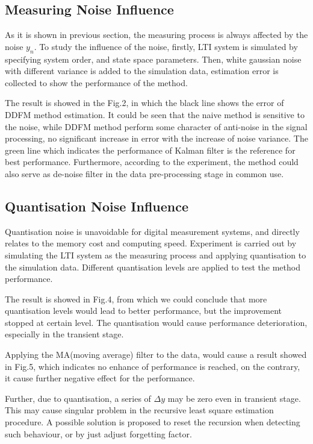 \documentclass[journal]{IEEEtran}
\begin{document}
\subsection{Measuring Noise Influence}
As it is shown in previous section, the measuring process is always affected by the noise $y_n$. To study the influence of the noise, firstly, LTI system is simulated by specifying system order, and state space parameters. Then, white gaussian noise with different variance is added to the simulation data, estimation error is collected to show the performance of the method. 

The result is showed in the Fig.2, in which the black line shows the error of DDFM method estimation. It could be seen that the naive method is sensitive to the noise, while DDFM method perform some character of anti-noise in the signal processing, no significant increase in error with the increase of noise variance. The green line which indicates the performance of Kalman filter is the reference for best performance.
Furthermore, according to the experiment, the method could also serve as de-noise filter in the data pre-processing stage in common use.

\subsection{Quantisation Noise Influence}
Quantisation noise is unavoidable for digital measurement systems, and directly relates to the memory cost and computing speed. Experiment is carried out by simulating the LTI system as the measuring process and applying quantisation to the simulation data. Different quantisation levels are applied to test the method performance.

The result is showed in Fig.4, from which we could conclude that more quantisation levels would lead to better performance, but the improvement stopped at certain level. The quantisation would cause performance deterioration, especially in the transient stage.

Applying the MA(moving average) filter to the data, would cause a result showed in Fig.5, which indicates no enhance of performance is reached, on the contrary, it cause further negative effect for the performance.

Further, due to quantisation, a series of $\Delta y$ may be zero even in transient stage. This may cause singular problem in the recursive least square estimation procedure. A possible solution is proposed to reset the recursion when detecting such behaviour, or by just adjust forgetting factor.
\end{document}
